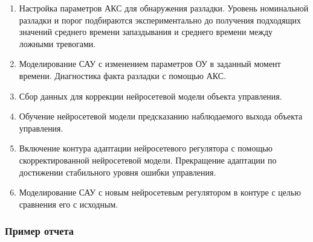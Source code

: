 \begin{enumerate}
\item Настройка параметров АКС для обнаружения разладки.  Уровень
  номинальной разладки и порог подбираются экспериментально до
  получения подходящих значений среднего времени запаздывания и
  среднего времени между ложными тревогами.
\item Моделирование САУ с изменением параметров ОУ в заданный момент
  времени.  Диагностика факта разладки с помощью АКС.
\item Сбор данных для коррекции нейросетевой модели объекта
  управления.
\item Обучение нейросетевой модели предсказанию наблюдаемого выхода
  объекта управления.
\item Включение контура адаптации нейросетевого регулятора с помощью
  скорректированной нейросетевой модели.  Прекращение адаптации по
  достижении стабильного уровня ошибки управления.
\item Моделирование САУ с новым нейросетевым регулятором в контуре
  с целью сравнения его с исходным.
\end{enumerate}

\subsubsection{Пример отчета}





